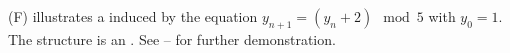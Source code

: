 
\begin{example}
\label{ex:ocs_prng}
 (F) illustrates a 
induced by the equation $y_{n+1}=(y_n+2)\mod5$ with $y_0=1$.
The structure is an .
See -- for further demonstration.
\end{example}
